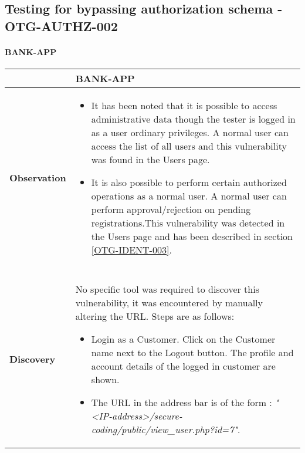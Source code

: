 \subsection{Testing for bypassing authorization schema - OTG-AUTHZ-002} \label{OTG-AUTHZ-002}

\paragraph{BANK-APP} \mbox{}
\begin{longtable*}{p{.20\textwidth} | p{.80\textwidth}}
    \hline
    & \textbf{BANK-APP} \\
    \hline
    \textbf{Observation} &
   \begin {itemize}
   	\item It has been noted that it is possible to access administrative data though the tester is logged in as a user ordinary privileges. A normal user can access the list of all users and this vulnerability was found in the Users page.
   
   \item It is also possible to perform certain authorized operations as a normal user. A normal user can perform approval/rejection on pending registrations.This vulnerability was detected in the Users page and has been described in section \ref{OTG-IDENT-003}.
   
   \end{itemize}
    \\\\
    \textbf{Discovery} &
       No specific tool was required to discover this vulnerability, it was encountered by manually altering the URL. Steps are as follows:
          \begin{itemize}
      	    \item Login as a Customer. Click on the Customer name next to the Logout button. The profile and account details of the logged in customer are shown.
      	    
      	    \item The URL in the address bar is of the form : \textit{"<IP-address>/secure-coding/public/view\_user.php?id=7"}.
      	    

\end{itemize}
\end{longtable*}

